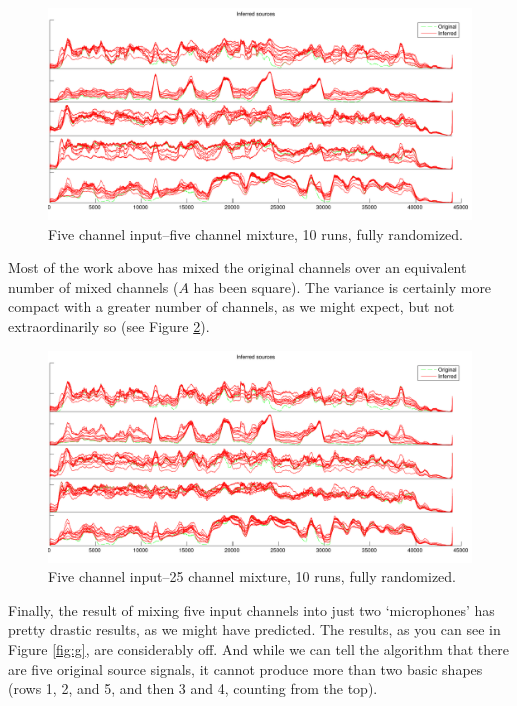\documentclass[11pt]{report}
\begin{document}
\begin{figure}[H]
  \centering
  \includegraphics[width=\textwidth]{../plots/5channels10b.pdf}
  \caption{Five channel input--five channel mixture, 10 runs, fully randomized.}
  \label{fig:e}
\end{figure}
Most of the work above has mixed the original channels over an equivalent number of mixed channels ($A$ has been square). The variance is certainly more compact with a greater number of channels, as we might expect, but not extraordinarily so (see Figure \ref{fig:f}).
\begin{figure}[H]
  \centering
  \includegraphics[width=\textwidth]{../plots/5channels10-25mix.pdf}
  \caption{Five channel input--25 channel mixture, 10 runs, fully randomized.}
  \label{fig:f}
\end{figure}
Finally, the result of mixing five input channels into just two `microphones' has pretty drastic results, as we might have predicted. The results, as you can see in Figure \ref{fig:g}, are considerably off. And while we can tell the algorithm that there are five original source signals, it cannot produce more than two basic shapes (rows 1, 2, and 5, and then 3 and 4, counting from the top).
\end{document}
